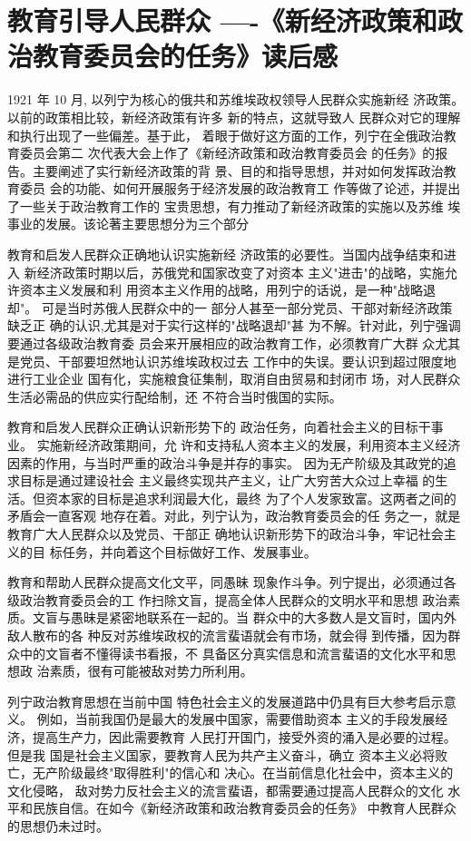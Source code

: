 \documentclass[a4paper,12pt]{book}
\numberwithin{equation}{chapter}
\theoremstyle{definition}
\begin{document}
\pagestyle{plain}
\setcounter{page}{1}
\section*{\centering \Large \qquad \qquad \qquad 教育引导人民群众
  \newline ----《新经济政策和政治教育委员会的任务》读后感}


1921 年 10 月, 以列宁为核心的俄共和苏维埃政权领导人民群众实施新经
济政策。以前的政策相比较，新经济政策有许多
新的特点，这就导致人
民群众对它的理解和执行出现了一些偏差。基于此，
着眼于做好这方面的工作，列宁在全俄政治教育委员会第二
次代表大会上作了《新经济政策和政治教育委员会
的任务》的报告。主要阐述了实行新经济政策的背
景、目的和指导思想，并对如何发挥政治教育委员
会的功能、如何开展服务于经济发展的政治教育工
作等做了论述，并提出了一些关于政治教育工作的
宝贵思想，有力推动了新经济政策的实施以及苏维
埃事业的发展。该论著主要思想分为三个部分

教育和启发人民群众正确地认识实施新经
济政策的必要性。当国内战争结束和进入
新经济政策时期以后，苏俄党和国家改变了对资本
主义"进击"的战略，实施允许资本主义发展和利
用资本主义作用的战略，用列宁的话说，是一种"战略退却"。
可是当时苏俄人民群众中的一
部分人甚至一部分党员、干部对新经济政策缺乏正
确的认识,尤其是对于实行这样的"战略退却"甚
为不解。针对此，列宁强调要通过各级政治教育委
员会来开展相应的政治教育工作，必须教育广大群
众尤其是党员、干部要坦然地认识苏维埃政权过去
工作中的失误。要认识到超过限度地进行工业企业
国有化，实施粮食征集制，取消自由贸易和封闭市
场，对人民群众生活必需品的供应实行配给制，还
不符合当时俄国的实际。

教育和启发人民群众正确认识新形势下的
政治任务，向着社会主义的目标干事业。
实施新经济政策期间，允
许和支持私人资本主义的发展，利用资本主义经济
因素的作用，与当时严重的政治斗争是并存的事实。
因为无产阶级及其政党的追求目标是通过建设社会
主义最终实现共产主义，让广大穷苦大众过上幸福
的生活。但资本家的目标是追求利润最大化，最终
为了个人发家致富。这两者之间的矛盾会一直客观
地存在着。对此，列宁认为，政治教育委员会的任
务之一，就是教育广大人民群众以及党员、干部正
确地认识新形势下的政治斗争，牢记社会主义的目
标任务，并向着这个目标做好工作、发展事业。

教育和帮助人民群众提高文化文平，同愚昧
现象作斗争。列宁提出，必须通过各级政治教育委员会的工
作扫除文盲，提高全体人民群众的文明水平和思想
政治素质。文盲与愚昧是紧密地联系在一起的。当
群众中的大多数人是文盲时，国内外敌人散布的各
种反对苏维埃政权的流言蜚语就会有市场，就会得
到传播，因为群众中的文盲者不懂得读书看报，不
具备区分真实信息和流言蜚语的文化水平和思想政
治素质，很有可能被敌对势力所利用。

列宁政治教育思想在当前中国
特色社会主义的发展道路中仍具有巨大参考启示意义。
例如，当前我国仍是最大的发展中国家，需要借助资本
主义的手段发展经济，提高生产力，因此需要教育
人民打开国门，接受外资的涌入是必要的过程。但是我
国是社会主义国家，要教育人民为共产主义奋斗，确立
资本主义必将败亡，无产阶级最终"取得胜利"的信心和
决心。在当前信息化社会中，资本主义的文化侵略，
敌对势力反社会主义的流言蜚语，都需要通过提高人民群众的文化
水平和民族自信。在如今《新经济政策和政治教育委员会的任务》
中教育人民群众的思想仍未过时。
\end{document}
